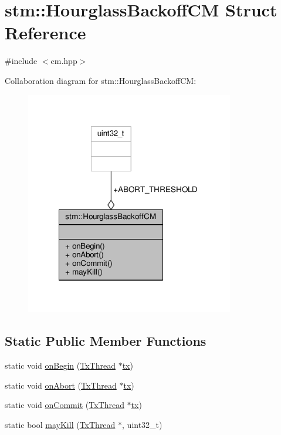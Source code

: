 \hypertarget{structstm_1_1HourglassBackoffCM}{\section{stm\-:\-:Hourglass\-Backoff\-C\-M Struct Reference}
\label{structstm_1_1HourglassBackoffCM}
}


{\ttfamily \#include $<$cm.\-hpp$>$}



Collaboration diagram for stm\-:\-:Hourglass\-Backoff\-C\-M\-:
\nopagebreak
\begin{figure}[H]
\begin{center}
\leavevmode
\includegraphics[width=258pt]{structstm_1_1HourglassBackoffCM__coll__graph}
\end{center}
\end{figure}
\subsection*{Static Public Member Functions}
\begin{DoxyCompactItemize}
\item 
static void \hyperlink{structstm_1_1HourglassBackoffCM_a92de4e5a4cb98e10206f885550f72086}{on\-Begin} (\hyperlink{structstm_1_1TxThread}{Tx\-Thread} $\ast$\hyperlink{stmskip_8cc_a0f1c58699b83ce5a08bd9ee859250d72}{tx})
\item 
static void \hyperlink{structstm_1_1HourglassBackoffCM_a1a879f779ff65d8d3d2d0ae3a15088b7}{on\-Abort} (\hyperlink{structstm_1_1TxThread}{Tx\-Thread} $\ast$\hyperlink{stmskip_8cc_a0f1c58699b83ce5a08bd9ee859250d72}{tx})
\item 
static void \hyperlink{structstm_1_1HourglassBackoffCM_a2fd70ced29b70089607ed8e732852fa1}{on\-Commit} (\hyperlink{structstm_1_1TxThread}{Tx\-Thread} $\ast$\hyperlink{stmskip_8cc_a0f1c58699b83ce5a08bd9ee859250d72}{tx})
\item 
static bool \hyperlink{structstm_1_1HourglassBackoffCM_ac5f9be59fc46c2494cb5743510634bd0}{may\-Kill} (\hyperlink{structstm_1_1TxThread}{Tx\-Thread} $\ast$, uint32\-\_\-t)
\end{DoxyCompactItemize}
